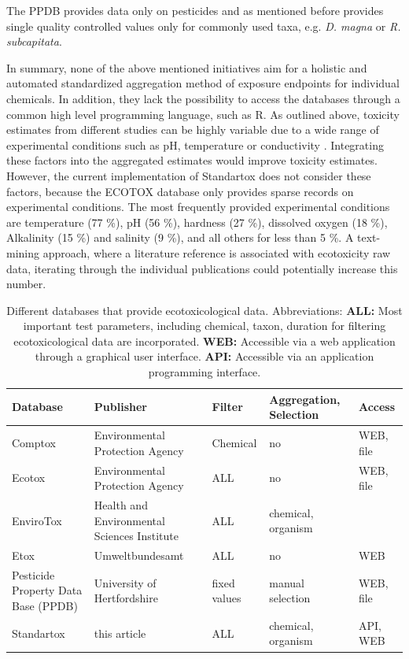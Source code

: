 \documentclass[journal,datadescriptor,accept,moreauthors,pdftex]{Definitions/mdpi}
\begin{document}
The PPDB provides data only on pesticides and as mentioned before provides single quality controlled values only for commonly used taxa, e.g. \textit{D. magna} or \textit{R. subcapitata}.

In summary, none of the above mentioned initiatives aim for a holistic and automated standardized aggregation method of exposure endpoints for individual chemicals. In addition, they lack the possibility to access the databases through a common high level programming language, such as R. As outlined above, toxicity estimates from different studies can be highly variable due to a wide range of experimental conditions such as pH, temperature or conductivity \citep{rosenkrantz_influence_2013, li_temperature_2011}. Integrating these factors into the aggregated estimates would improve toxicity estimates. However, the current implementation of Standartox does not consider these factors, because the ECOTOX database only provides sparse records on experimental conditions. The most frequently provided experimental conditions are temperature (77 \%), pH (56 \%), hardness (27 \%), dissolved oxygen (18 \%), Alkalinity (15 \%) and salinity (9 \%), and all others for less than 5 \%. A text-mining approach, where a literature reference is associated with  ecotoxicity raw data, iterating through the individual publications could potentially increase this number.

\begin{table}[H]
    \caption{Different databases that provide ecotoxicological data. Abbreviations: \textbf{ALL:} Most important test parameters, including chemical, taxon, duration for filtering ecotoxicological data are incorporated. \textbf{WEB:} Accessible via a web application through a graphical user interface. \textbf{API:} Accessible via an application programming interface.}
    \label{tab:database-differences}
    \centering
    \begin{tabular}{m{3cm}m{3cm}m{2cm}m{2cm}m{1cm}}
    \toprule
    \textbf{Database} & \textbf{Publisher} & \textbf{Filter} & \textbf{Aggregation, Selection} & \textbf{Access} \\
    \midrule
    Comptox & Environmental Protection Agency & Chemical & no & WEB, file \\
    Ecotox & Environmental Protection Agency & ALL & no & WEB, file \\
    EnviroTox & Health and Environmental Sciences Institute & ALL & chemical, organism \\
    Etox & Umweltbundesamt & ALL & no & WEB \\
    Pesticide Property Data Base (PPDB) & University of Hertfordshire & fixed values & manual selection & WEB, file \\
    Standartox & this article & ALL & chemical, organism & API, WEB \\
    \bottomrule
\end{tabular}
\end{table}
\end{document}
